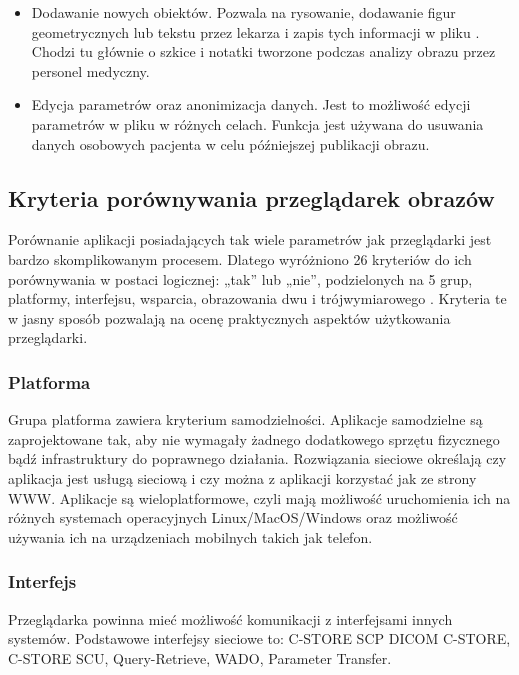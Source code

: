 \begin{itemize}
    \item Dodawanie nowych obiektów.
          Pozwala na rysowanie, dodawanie figur geometrycznych lub tekstu przez lekarza i zapis tych informacji w pliku \DICOM.
          Chodzi tu głównie o szkice i notatki tworzone podczas analizy obrazu przez personel medyczny.

    \item Edycja parametrów oraz anonimizacja danych.
          Jest to możliwość edycji parametrów w pliku \DICOM w różnych celach.
          Funkcja jest używana do usuwania danych osobowych pacjenta w celu późniejszej publikacji obrazu.

\end{itemize}

\subsection{Kryteria porównywania przeglądarek obrazów}

Porównanie aplikacji posiadających tak wiele parametrów jak przeglądarki \DICOM jest bardzo skomplikowanym procesem.
Dlatego wyróżniono 26 kryteriów do ich porównywania w postaci logicznej: „tak” lub „nie”, podzielonych na 5 grup, platformy, interfejsu, wsparcia, obrazowania dwu i trójwymiarowego \cite{SurveyofDICOMViewer}.
Kryteria te w jasny sposób pozwalają na ocenę praktycznych aspektów użytkowania przeglądarki.

\subsubsection{Platforma}

Grupa platforma zawiera kryterium samodzielności.
Aplikacje samodzielne są zaprojektowane tak, aby nie wymagały żadnego dodatkowego sprzętu fizycznego bądź infrastruktury do poprawnego działania.
Rozwiązania sieciowe określają czy aplikacja jest usługą sieciową i czy można z aplikacji korzystać jak ze strony WWW.
Aplikacje są wieloplatformowe, czyli mają możliwość uruchomienia ich na różnych systemach operacyjnych Linux/MacOS/Windows oraz możliwość używania ich na urządzeniach mobilnych takich jak telefon.

\subsubsection{Interfejs}

Przeglądarka powinna mieć możliwość komunikacji z interfejsami innych systemów.
Podstawowe interfejsy sieciowe to: C-STORE SCP DICOM C-STORE, C-STORE SCU, Query-Retrieve, WADO, Parameter Transfer.


